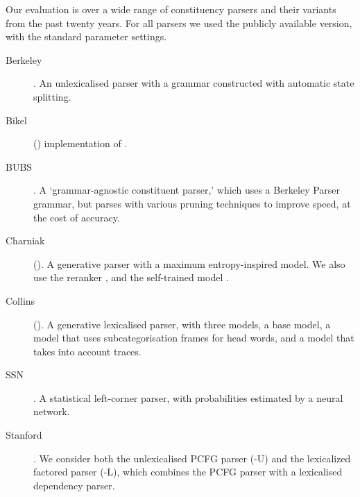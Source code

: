 Our evaluation is over a wide range of \ptb constituency parsers and their variants from the past twenty years.
For all parsers we used the publicly available version, with the standard parameter settings.

\begin{description}
	\item[ Berkeley] \parencite{Petrov-etal:2006,Petrov-Klein:2007}. An
	unlexicalised parser with a grammar constructed with automatic state
	splitting.

	\item[ Bikel] (\citeyear{Bikel:2004}) implementation of \textcite{Collins:1997}.

	\item[ BUBS]
	\parencite{Dunlop-Bodenstab-Roark:2011,Bodenstab-Dunlop-Hall-Roark:2011}. A
	`grammar-agnostic constituent parser,' which uses a Berkeley Parser grammar,
	but parses with various pruning techniques to improve speed, at the cost of
	accuracy.

	\item[ Charniak] (\citeyear{Charniak:2000}). A generative parser with a
	maximum entropy-inspired model.  We also use the reranker
	\parencite{Charniak-Johnson:2005}, and the self-trained model
	\parencite{McClosky-Charniak-Johnson:2006}.

	\item[ Collins] (\citeyear{Collins:1997}). A generative lexicalised parser, with
	three models, a base model, a model that uses subcategorisation
	frames for head words, and a model that takes into account traces.

	\item[ SSN] \parencite{Henderson:2003,Henderson:2004}. A statistical left-corner
	parser, with probabilities estimated by a neural network.

	\item[ Stanford] \parencite{Klein-Manning:2003:ACL,Klein-Manning:2003:NIPS}. We
	consider both the unlexicalised PCFG parser (-U) and the lexicalized factored parser
	(-L), which combines the PCFG parser with a lexicalised dependency parser.
\end{description}

